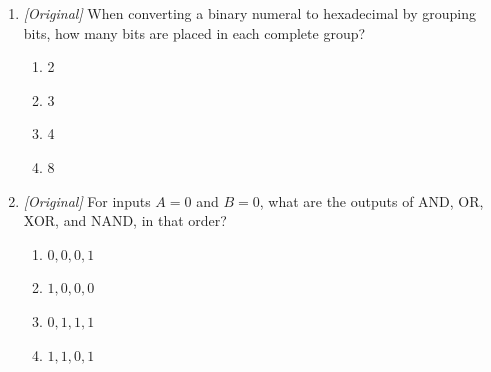 \begin{enumerate}[label=\textbf{Q\arabic*.}, leftmargin=*]
\begin{enumerate}[label=\Alph*.]
    \item 13
  \end{enumerate}
\item \textit{[Original]} When converting a binary numeral to hexadecimal by
  grouping bits, how many bits are placed in each complete group?
  \begin{enumerate}[label=\Alph*.]
    \item 2
    \item 3
    \item 4
    \item 8
  \end{enumerate}
\item \textit{[Original]} For inputs $A=0$ and $B=0$, what are the outputs
  of AND, OR, XOR, and NAND, in that order?
  \begin{enumerate}[label=\Alph*.]
    \item $0,0,0,1$
    \item $1,0,0,0$
    \item $0,1,1,1$
    \item $1,1,0,1$
  \end{enumerate}


\end{enumerate}
